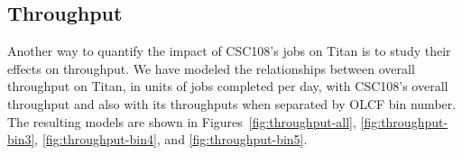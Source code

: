%
%
%
%

\subsection{Throughput}
\label{subsec:throughput}

Another way to quantify the impact of CSC108's jobs on Titan is to study their
effects on throughput. We have modeled the relationships between overall
throughput on Titan, in units of jobs completed per day, with CSC108's overall
throughput and also with its throughputs when separated by OLCF bin number. The
resulting models are shown in Figures~\ref{fig:throughput-all},
\ref{fig:throughput-bin3}, \ref{fig:throughput-bin4}, and
\ref{fig:throughput-bin5}.


